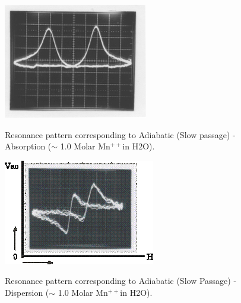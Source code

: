 \documentclass{../lab}
\begin{document}
\begin{figure}[h]
\begin{minipage}[t]{0.31\textwidth}
    \href{http://experimentationlab.berkeley.edu/sites/default/files/images/NMR17.gif}{\includegraphics[width=\linewidth]{images/NMR17.png}}
    \caption{Resonance pattern corresponding to Adiabatic (Slow passage) - Absorption ($\sim$ 1.0 Molar Mn$^{++}$in H2O).}
    \label{fig:AdiabaticAbsorption}
\end{minipage}\hfill
\begin{minipage}[t]{0.31\textwidth}
    \href{http://experimentationlab.berkeley.edu/sites/default/files/images/250px-NMR18.gif}{\includegraphics[width=\linewidth]{images/250px-NMR18.png}}
    \caption{Resonance pattern corresponding to Adiabatic (Slow Passage) - Dispersion ($\sim$ 1.0 Molar Mn$^{++}$in H2O).}

\end{minipage}
\end{figure}
\end{document}
